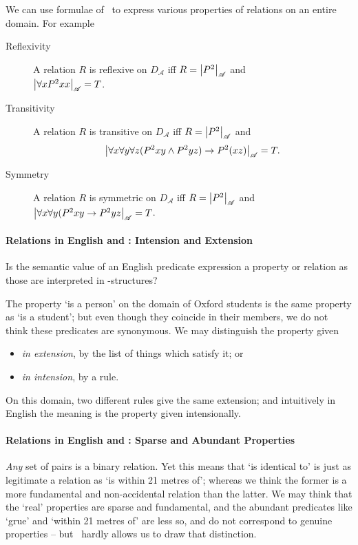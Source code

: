  We can use formulae of \ltwo\ to express various properties of relations on an entire domain. For example \begin{description}
 	\item [Reflexivity] A relation $R$ is reflexive on $D_{\mathscr{A}}$ iff $R = \left|P^{2}\right|_{\mathscr{A}}$ and\\ $\left|\forall x P^{2}xx\right|_{\mathscr{A}}=T$. 
\item [Transitivity] A relation $R$ is transitive on $D_{\mathscr{A}}$ iff $R = \left|P^{2}\right|_{\mathscr{A}}$ and $$\left|\forall x \forall y \forall z (P^{2}xy \wedge P^{2}yz) \to P^{2}(xz)\right|_{\mathscr{A}}=T.$$ 
\item [Symmetry] A relation $R$ is symmetric on $D_{\mathscr{A}}$ iff $R = \left|P^{2}\right|_{\mathscr{A}}$ and\\ $\left|\forall x \forall y  (P^{2}xy \to P^{2}yz\right|_{\mathscr{A}}=T$. 
 \end{description}

\paragraph{Relations in English and \ltwo: Intension and Extension}

Is the semantic value of an English predicate expression a property or relation as those are interpreted in \ltwo-structures?

The property `is a person' on the domain of Oxford students is the same property as `is a student'; but even though they coincide in their members, we do not think these predicates are synonymous. We may distinguish the property given \begin{itemize}\item \emph{in extension}, by the list of things which satisfy it; or \item \emph{in intension}, by a rule.\end{itemize} On this domain, two different rules give the same extension; and intuitively in English the meaning is the property given intensionally.

\paragraph{Relations in English and \ltwo: Sparse and Abundant Properties}


 \emph{Any} set of pairs is a binary relation. Yet this means that `is identical to' is just as legitimate a relation as `is within 21 metres of'; whereas we think the former is a more fundamental and non-accidental relation than the latter. We may think that the `real' properties are sparse and fundamental, and the abundant predicates like `grue' and `within 21 metres of' are less so, and do not correspond to genuine properties – but \ltwo\ hardly allows us to draw that distinction.

